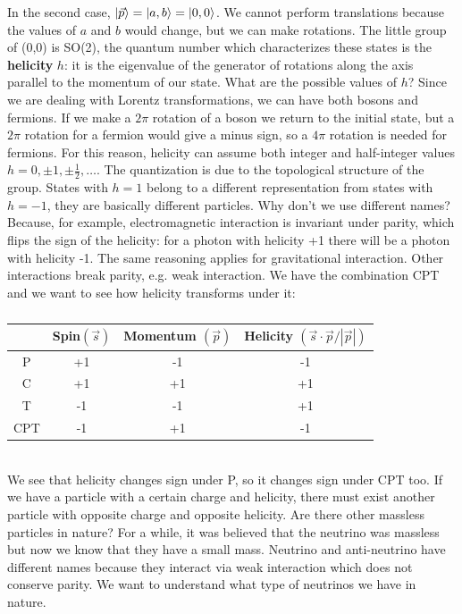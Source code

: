 \documentclass[../main.tex]{subfiles}
\begin{document}
In the second case, $\ket{\vec{p}}=\ket{a,b}=\ket{0,0}$. We cannot perform translations because the values of $a$ and $b$ would change, but we can make rotations. The little group of (0,0) is SO(2), the quantum number which characterizes these states is the \textbf{helicity} $h$: it is the eigenvalue of the generator of rotations along the axis parallel to the momentum of our state. What are the possible values of $h$? Since we are dealing with Lorentz transformations, we can have both bosons and fermions. If we make a $2\pi$ rotation of a boson we return to the initial state, but a $2\pi$ rotation for a fermion would give a minus sign, so a $4\pi$ rotation is needed for fermions. For this reason, helicity can assume both integer and half-integer values $h=0,\pm1,\pm\frac{1}{2},\dots$. The quantization is due to the topological structure of the group. States with $h=1$ belong to a different representation from states with $h=-1$, they are basically different particles. Why don't we use different names? Because, for example, electromagnetic interaction is invariant under parity, which flips the sign of the helicity: for a photon with helicity +1 there will be a photon with helicity -1. The same reasoning applies for gravitational interaction. Other interactions break parity, e.g. weak interaction. We have the combination CPT and we want to see how helicity transforms under it:
\begin{table}[h]
    \centering
    \begin{tabular}{c|ccc}
     & Spin$(\vec{s})$ & Momentum $(\vec{p})$ & Helicity $(\vec{s}\cdot\vec{p}/|\vec{p}|)$ \\
     \hline
     P & +1 & -1 & -1 \\
     C & +1 & +1 & +1 \\
     T & -1 & -1 & +1 \\
     CPT & -1 & +1 & -1 \\
     \hline
    \end{tabular}
    \caption*{}
    \label{tab:my_label}
\end{table}\\
\noindent
We see that helicity changes sign under P, so it changes sign under CPT too. If we have a particle with a certain charge and helicity, there must exist another particle with opposite charge and opposite helicity. Are there other massless particles in nature? For a while, it was believed that the neutrino was massless but now we know that they have a small mass. Neutrino and anti-neutrino have different names because they interact via weak interaction which does not conserve parity. We want to understand what type of neutrinos we have in nature.
\end{document}
